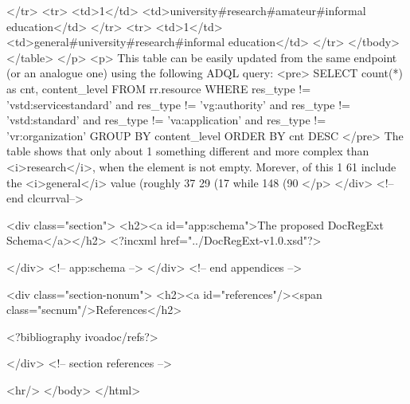 </tr>
<tr>
 <td>1</td> <td>university#research#amateur#informal education</td>
</tr>
<tr>
 <td>1</td> <td>general#university#research#informal education</td>
</tr>
</tbody>
</table>
</p>
<p>
This table can be easily updated from the same endpoint (or an analogue 
one) using the following ADQL query:
<pre>
SELECT 
  count(*) as cnt, content_level
FROM 
  rr.resource
WHERE
  res_type != 'vstd:servicestandard' and 
  res_type != 'vg:authority' and 
  res_type != 'vstd:standard' and 
  res_type != 'va:application' and
  res_type != 'vr:organization'
GROUP BY content_level
ORDER BY cnt DESC
</pre>
The table shows that only about 1%
something different and more complex than <i>research</i>, when 
the element is not empty. Morever, of this 1%
61 include the <i>general</i> value (roughly 37%
29 (17%
while 148 (90%
</p>
</div> <!-- end clcurrval-->

<div class="section">
<h2><a id="app:schema">The proposed DocRegExt Schema</a></h2>
<?incxml href="../DocRegExt-v1.0.xsd"?>

</div> <!-- app:schema -->
</div> <!-- end appendices -->

<div class="section-nonum">
<h2><a id="references"/><span class="secnum"/>References</h2>

<?bibliography ivoadoc/refs?>

</div> <!-- section references -->

<hr/>
</body>
</html>
